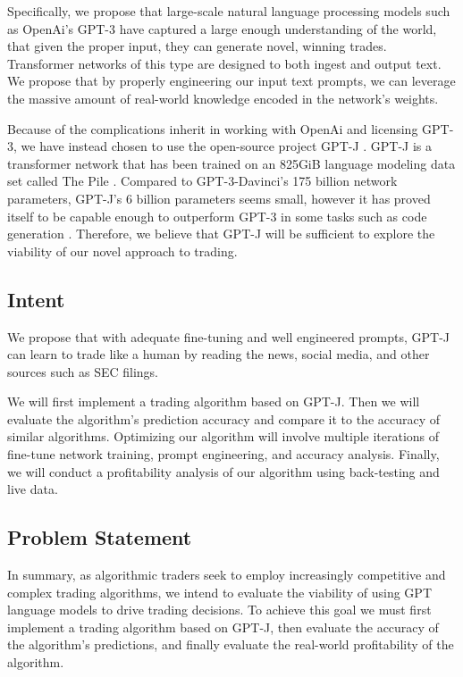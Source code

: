 \documentclass[conference]{IEEEtran}
\begin{document}
Specifically, we propose that large-scale natural language processing models such as OpenAi's GPT-3 \cite{Brown2020} have captured a large enough understanding of the world, that given the proper input, they can generate novel, winning trades. Transformer networks of this type are designed to both ingest and output text. We propose that by properly engineering our input text prompts, we can leverage the massive amount of real-world knowledge encoded in the network's weights.

Because of the complications inherit in working with OpenAi and licensing GPT-3, we have instead chosen to use the open-source project GPT-J \cite{mesh-transformer-jax}. GPT-J is a transformer network \cite{Vaswani2017} that has been trained on an 825GiB language modeling data set called The Pile \cite{Gao2021}. Compared to GPT-3-Davinci's 175 billion network parameters, GPT-J's 6 billion parameters seems small, however it has proved itself to be capable enough to outperform GPT-3 in some tasks such as code generation \cite{forefront}. Therefore, we believe that GPT-J will be sufficient to explore the viability of our novel approach to trading.

\subsection{Intent}
We propose that with adequate fine-tuning and well engineered prompts, GPT-J can learn to trade like a human by reading the news, social media, and other sources such as SEC filings.

We will first implement a trading algorithm based on GPT-J. Then we will evaluate the algorithm's prediction accuracy and compare it to the accuracy of similar algorithms. Optimizing our algorithm will involve multiple iterations of fine-tune network training, prompt engineering, and accuracy analysis. Finally, we will conduct a profitability analysis of our algorithm using back-testing and live data.

\subsection{Problem Statement}
In summary, as algorithmic traders seek to employ increasingly competitive and complex trading algorithms, we intend to evaluate the viability of using GPT language models to drive trading decisions. To achieve this goal we must first implement a trading algorithm based on GPT-J, then evaluate the accuracy of the algorithm's predictions, and finally evaluate the real-world profitability of the algorithm.
\end{document}
